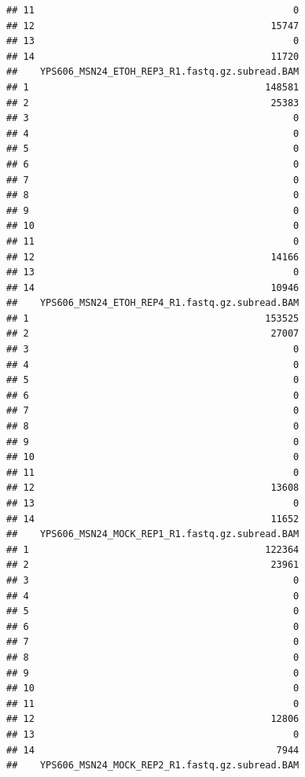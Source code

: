 \documentclass[
]{book}
\begin{document}
\begin{verbatim}
## 11                                              0
## 12                                          15747
## 13                                              0
## 14                                          11720
##    YPS606_MSN24_ETOH_REP3_R1.fastq.gz.subread.BAM
## 1                                          148581
## 2                                           25383
## 3                                               0
## 4                                               0
## 5                                               0
## 6                                               0
## 7                                               0
## 8                                               0
## 9                                               0
## 10                                              0
## 11                                              0
## 12                                          14166
## 13                                              0
## 14                                          10946
##    YPS606_MSN24_ETOH_REP4_R1.fastq.gz.subread.BAM
## 1                                          153525
## 2                                           27007
## 3                                               0
## 4                                               0
## 5                                               0
## 6                                               0
## 7                                               0
## 8                                               0
## 9                                               0
## 10                                              0
## 11                                              0
## 12                                          13608
## 13                                              0
## 14                                          11652
##    YPS606_MSN24_MOCK_REP1_R1.fastq.gz.subread.BAM
## 1                                          122364
## 2                                           23961
## 3                                               0
## 4                                               0
## 5                                               0
## 6                                               0
## 7                                               0
## 8                                               0
## 9                                               0
## 10                                              0
## 11                                              0
## 12                                          12806
## 13                                              0
## 14                                           7944
##    YPS606_MSN24_MOCK_REP2_R1.fastq.gz.subread.BAM

\end{verbatim}
\end{document}

